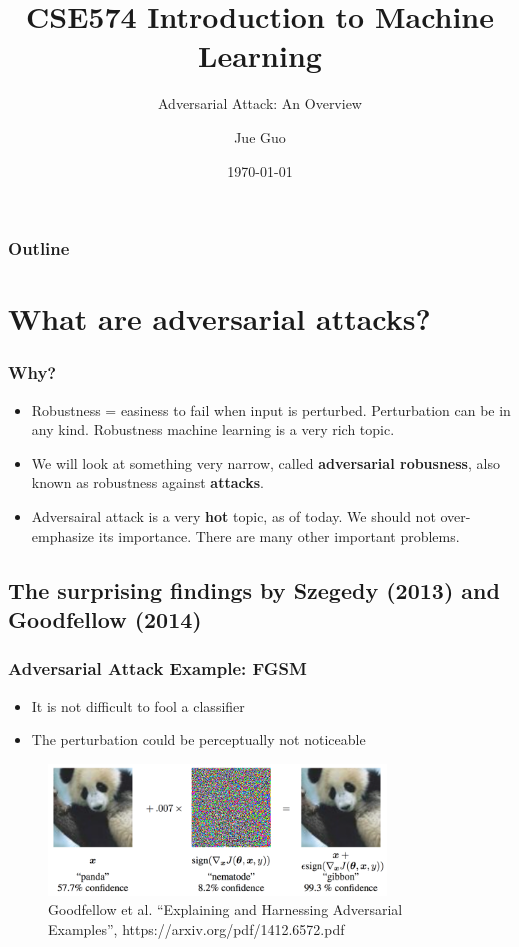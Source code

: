 \documentclass[9pt,dvipsnames]{beamer}
\title{CSE574 Introduction to Machine Learning}
\subtitle{Adversarial Attack: An Overview}
\author{Jue Guo}
\institute{University at Buffalo}
\date{\today}
\begin{document}
\begin{frame}
    \titlepage
\end{frame}
\begin{frame}
    \frametitle{Outline}
    \tableofcontents
\end{frame}

\section{What are adversarial attacks?}
\begin{frame}
    \frametitle{Why?}
    \begin{itemize}
        \item Robustness = easiness to fail when input is perturbed. Perturbation can be in any kind. Robustness machine learning is a very rich topic.
        \item We will look at something very narrow, called \textbf{adversarial robusness}, also known as robustness against \textbf{attacks}.
        \item Adversairal attack is a very \textbf{hot} topic, as of today. We should not over-emphasize its importance. There are many other important problems.
    \end{itemize}
\end{frame}

\subsection{The surprising findings by Szegedy (2013) and Goodfellow (2014)}
\begin{frame}
    \frametitle{Adversarial Attack Example: FGSM}
    \begin{itemize}
        \item It is not difficult to fool a classifier
        \item The perturbation could be perceptually not noticeable
    \end{itemize}
    \begin{figure}[ht]
        \centering
        \includegraphics[width=0.8\textwidth]{imgs/adv_overview_1.png}
        \caption{Goodfellow et al. “Explaining and Harnessing Adversarial Examples”, https://arxiv.org/pdf/1412.6572.pdf}
    \end{figure}
\end{frame}
\end{document}
